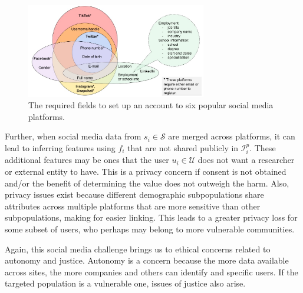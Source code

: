 \documentclass[11pt]{article} %
\begin{document}
\begin{figure}[tb]
    \centering
        \includegraphics[width=0.7\textwidth]{figs/req_fields1.png}
    \caption{The required fields to set up an account to six popular social media platforms.}
    \label{fig:req_fields}
\end{figure}

Further, when social media data from $s_i \in \mathcal{S}$ are merged across platforms, it can lead to inferring features using $f_i$ that are not shared publicly in ${\mathcal{I}^p_i}$. These additional features may be ones that the user $u_i \in \mathcal{U}$ does not want a researcher or external entity to have. This is a privacy concern if consent is not obtained and/or the benefit of determining the value does not outweigh the harm. Also, privacy issues exist because different demographic subpopulations share attributes across multiple platforms that are more sensitive than other subpopulations, making for easier linking. This leads to a greater privacy loss for some subset of users, who perhaps may belong to more vulnerable communities.

Again, this social media challenge brings us to ethical concerns related to autonomy and justice. 
Autonomy is a concern because the more data available across sites, the more companies and others can identify and specific users. If the targeted population is a vulnerable one, issues of justice also arise. 
\end{document}
